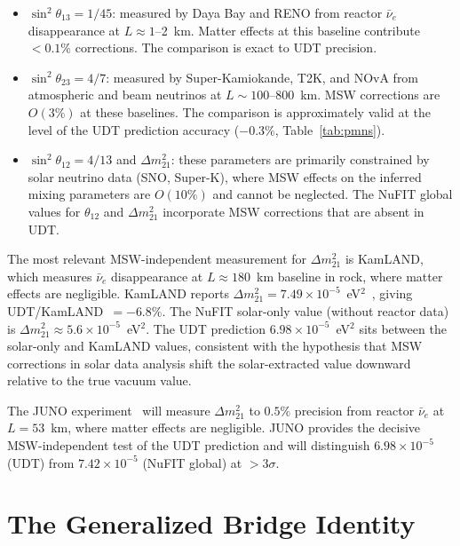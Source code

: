 \documentclass[aps,prd,twocolumn,superscriptaddress,nofootinbib,longbibliography]{revtex4-2}
\begin{document}
\begin{itemize}
\item $\sin^2\theta_{13} = 1/45$: measured by Daya Bay and RENO from
  reactor $\bar{\nu}_e$ disappearance at $L \approx 1$--2~km.  Matter
  effects at this baseline contribute $< 0.1\%$ corrections.  The
  comparison is exact to UDT precision.

\item $\sin^2\theta_{23} = 4/7$: measured by Super-Kamiokande, T2K,
  and NOvA from atmospheric and beam neutrinos at
  $L \sim 100$--800~km.  MSW corrections are $O(3\%)$ at these
  baselines.  The comparison is approximately valid at the level of
  the UDT prediction accuracy ($-0.3\%$, Table~\ref{tab:pmns}).

\item $\sin^2\theta_{12} = 4/13$ and $\Delta m^2_{21}$: these
  parameters are primarily constrained by solar neutrino data
  (SNO, Super-K), where MSW effects on the inferred mixing parameters
  are $O(10\%)$ and cannot be neglected.  The NuFIT global values for
  $\theta_{12}$ and $\Delta m^2_{21}$ incorporate MSW corrections that
  are absent in UDT.
\end{itemize}

The most relevant MSW-independent measurement for $\Delta m^2_{21}$ is
KamLAND, which measures $\bar{\nu}_e$ disappearance at
$L \approx 180$~km baseline in rock, where matter effects are
negligible.  KamLAND reports
$\Delta m^2_{21} = 7.49 \times 10^{-5}$~eV$^2$~\cite{KamLAND2013},
giving UDT/KamLAND~$= -6.8\%$.  The NuFIT solar-only value (without
reactor data) is $\Delta m^2_{21} \approx 5.6 \times 10^{-5}$~eV$^2$.
The UDT prediction $6.98 \times 10^{-5}$~eV$^2$ sits between the
solar-only and KamLAND values, consistent with the hypothesis that MSW
corrections in solar data analysis shift the solar-extracted value
downward relative to the true vacuum value.

The JUNO experiment~\cite{JUNO2022} will measure $\Delta m^2_{21}$ to
$0.5\%$ precision from reactor $\bar{\nu}_e$ at $L = 53$~km, where
matter effects are negligible.  JUNO provides the decisive
MSW-independent test of the UDT prediction and will distinguish
$6.98 \times 10^{-5}$ (UDT) from $7.42 \times 10^{-5}$ (NuFIT
global) at $> 3\sigma$.

\section{The Generalized Bridge Identity}\label{sec:bridge-gen}
\end{document}
